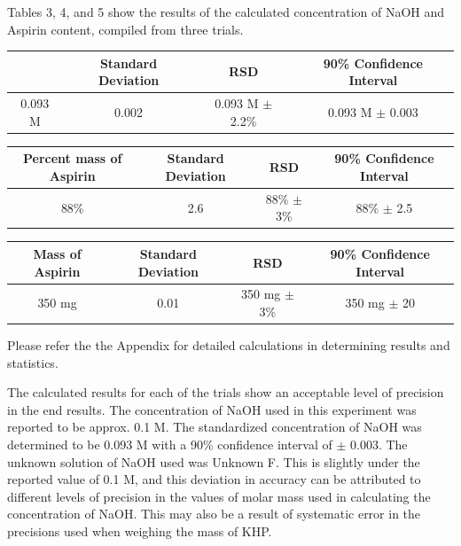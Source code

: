 \documentclass{article}
\begin{document}
Tables 3, 4, and 5 show the results of the calculated concentration of NaOH and Aspirin content,
compiled from three trials.
\begin{center}

        \begin{tabular}{ |c|c|c|c| }
                \hline
                [NaOH] & Standard Deviation & RSD & 90\% Confidence Interval \\
                \hline
                0.093 M & 0.002 & 0.093 M $\pm$ 2.2\% & 0.093 M $\pm$ 0.003 \\
                \hline
        \end{tabular}
        \vspace{1cm}
        
        \begin{tabular}{ |c|c|c|c| }
                \hline
                Percent mass of Aspirin & Standard Deviation & RSD & 90\%
                Confidence Interval \\
                \hline
                88\% & 2.6 & 88\% $\pm$ 3\% & 88\% $\pm$ 2.5 \\
                \hline
        \end{tabular}
        \vspace{1cm}

        \begin{tabular}{ |c|c|c|c| }
                \hline 
                Mass of Aspirin & Standard Deviation & RSD & 90\% Confidence Interval \\
                \hline
                350 mg & 0.01 & 350 mg $\pm$ 3\% & 350 mg $\pm$ 20 \\
                \hline
        \end{tabular}
\end{center}

Please refer the the Appendix for detailed calculations in determining results and statistics.

The calculated results for each of the trials show an acceptable level of
precision in the end results.  The concentration of NaOH used in this experiment
was reported to be approx. 0.1 M. The standardized concentration of NaOH was
determined to be 0.093 M with a 90\% confidence interval of $\pm$ 0.003. The
unknown solution of NaOH used was Unknown F.  This is slightly under the
reported value of 0.1 M, and this deviation in accuracy can be attributed to
different levels of precision in the values of molar mass used in calculating
the concentration of NaOH. This may also be a result of systematic error in the
precisions used when weighing the mass of KHP.
\end{document}
